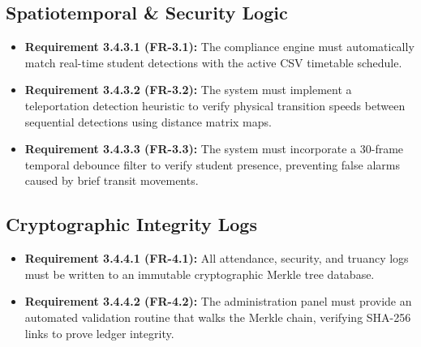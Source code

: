 \documentclass[12pt,a4paper,oneside]{report}
\begin{document}
\subsection{Spatiotemporal \& Security Logic}
\begin{itemize}
    \item \textbf{Requirement 3.4.3.1 (FR-3.1):} The compliance engine must automatically match real-time student detections with the active CSV timetable schedule.
    \item \textbf{Requirement 3.4.3.2 (FR-3.2):} The system must implement a teleportation detection heuristic to verify physical transition speeds between sequential detections using distance matrix maps.
    \item \textbf{Requirement 3.4.3.3 (FR-3.3):} The system must incorporate a 30-frame temporal debounce filter to verify student presence, preventing false alarms caused by brief transit movements.
\end{itemize}

\subsection{Cryptographic Integrity Logs}
\begin{itemize}
    \item \textbf{Requirement 3.4.4.1 (FR-4.1):} All attendance, security, and truancy logs must be written to an immutable cryptographic Merkle tree database.
    \item \textbf{Requirement 3.4.4.2 (FR-4.2):} The administration panel must provide an automated validation routine that walks the Merkle chain, verifying SHA-256 links to prove ledger integrity.
\end{itemize}
\end{document}
